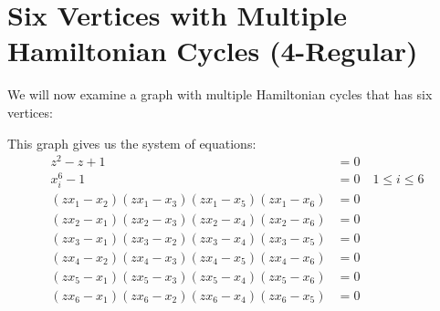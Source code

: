 \documentclass[letterpaper]{article}
\newcommand{\aln}[1]{\begin{align*} #1 \end{align*}} %
\begin{document}
\section{Six Vertices with Multiple Hamiltonian Cycles (4-Regular)}
We will now examine a graph with multiple Hamiltonian cycles that has six vertices:
\begin{center}
\end{center}
This graph gives us the system of equations:
\aln{
  z^2 - z + 1 &= 0\\
  x_i^6 - 1 &= 0 \quad 1 \leq i \leq 6\\
  (z x_1 - x_2) (z x_1 - x_3) (z x_1 - x_5) (z x_1 - x_6) &= 0\\
  (z x_2 - x_1) (z x_2 - x_3) (z x_2 - x_4) (z x_2 - x_6) &= 0\\
  (z x_3 - x_1) (z x_3 - x_2) (z x_3 - x_4) (z x_3 - x_5) &= 0\\
  (z x_4 - x_2) (z x_4 - x_3) (z x_4 - x_5) (z x_4 - x_6) &= 0\\
  (z x_5 - x_1) (z x_5 - x_3) (z x_5 - x_4) (z x_5 - x_6) &= 0\\
  (z x_6 - x_1) (z x_6 - x_2) (z x_6 - x_4) (z x_6 - x_5) &= 0
}

\newpage
\end{document}
